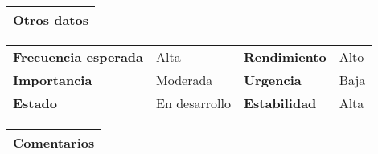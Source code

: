 \documentclass[11pt,a4paper]{article}
\begin{document}
\begin{table}[H]
	\begin{tabularx}{\textwidth}{X}
		\textbf{Otros datos}\\ \hline
	\end{tabularx}

	\begin{tabularx}{\textwidth}{lXlX}
		\textbf{Frecuencia esperada} & Alta & \textbf{Rendimiento} & Alto\\
		\textbf{Importancia} & Moderada & \textbf{Urgencia} & Baja \\
		\textbf{Estado} & En desarrollo & \textbf{Estabilidad} & Alta\\
	\end{tabularx}
	
	\begin{tabularx}{\textwidth}{X}
		\textbf{Comentarios}\\ \hline
	\end{tabularx}
\end{table}

\newpage



\end{document}
